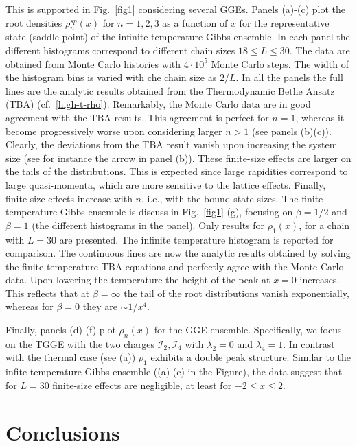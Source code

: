 \documentclass[twocolumn,superscriptaddress,prb,10pt]{revtex4-1}
\begin{document}
This is supported in Fig.~\ref{fig1} considering several GGEs. Panels (a)-(c) plot the  
root densities $\rho^{sp}_n(x)$ for $n=1,2,3$ as a function of $x$ for the representative 
state (saddle point) of the infinite-temperature Gibbs ensemble. In each panel 
the different histograms correspond to different chain sizes $18\le L\le 30$. The data are 
obtained from Monte Carlo histories with $4\cdot 10^5$ Monte Carlo steps. The width of 
the histogram bins is varied with che chain size as $2/L$. In all the panels the full lines 
are the analytic results obtained from the Thermodynamic Bethe Ansatz (TBA) 
(cf.~\eqref{high-t-rho}). Remarkably, the Monte Carlo data are in good agreement with 
the TBA results. This agreement is perfect for $n=1$, whereas it become progressively 
worse upon considering larger $n>1$ (see panels (b)(c)). Clearly, the deviations from the 
TBA result vanish upon increasing the system size (see for instance the arrow in panel (b)). 
These finite-size effects are larger on the tails of the distributions. This is expected 
since large rapidities  correspond to large quasi-momenta, which are more sensitive to the 
lattice effects. Finally, finite-size effects increase with $n$, i.e., with the bound 
state sizes. The finite-temperature Gibbs ensemble is discuss in Fig.~\ref{fig1} (g), 
focusing on $\beta=1/2$ and $\beta=1$ (the different histograms in the panel). Only results 
for $\rho_1(x)$, for a chain with $L=30$ are presented. The infinite temperature histogram is 
reported for comparison. The continuous lines are now the analytic results obtained by 
solving the finite-temperature TBA equations and perfectly agree with the Monte Carlo data. 
Upon lowering the temperature the height of the peak at $x=0$ increases. This reflects 
that at $\beta=\infty$ the tail of the root distributions vanish exponentially, whereas 
for $\beta=0$ they are $\sim 1/x^4$. 

Finally, panels (d)-(f) plot $\rho_n(x)$ for the GGE ensemble. Specifically, we focus on the 
TGGE with the two charges ${\mathcal I}_2,{\mathcal I}_4$ with $\lambda_2=0$ and $\lambda_4=1$. 
In contrast with the thermal case (see (a)) $\rho_1$ exhibits a double peak structure. Similar 
to the infite-temperature Gibbs ensemble ((a)-(c) in the Figure), the data suggest that 
for $L=30$ finite-size effects are negligible, at least for $-2\le x\le 2$. 


\section{Conclusions}
\end{document}
